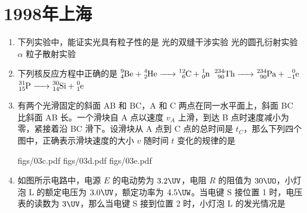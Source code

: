 \documentclass[\gkver]{gaokaozhenti}
\begin{document}
\chapter{1998年上海}

\begin{enumerate}
\item
下列实验中，能证实光具有粒子性的是
{光的双缝干涉实验}
{光的圆孔衍射实验}
{$\alpha$ 粒子散射实验}


\item
下列核反应方程中正确的是
{$\ce{^{9}_{4}Be + ^{4}_{2}He -> ^{12}_{6}C + ^{1}_{0}n}$}
{$\ce{^{234}_{90}Th -> ^{234}_{90}Pa + ^{0}_{-1}e}$}
{$\ce{^{31}_{15}P -> ^{30}_{14}Si + ^{0}_{1}e}$}


\item
有两个光滑固定的斜面 AB 和 BC，A 和 C 两点在同一水平面上，斜面 BC 比斜面 AB 长。一个滑块自 A 点以速度 $v_{A}$ 上滑，到达 B 点时速度减小为零，紧接着沿 BC 滑下。设滑块从 A 点到 C 点的总时间是 $t_{C}$，那么下列四个图中，正确表示滑块速度的大小 $v$ 随时间 $t$ 变化的规律的是

\onepicture[w=4.66cm]{}

{figs/03c.pdf}
{figs/03d.pdf}
{figs/03e.pdf}


\item
如图所示电路中，电源 $E$ 的电动势为 $3.2\UV$，电阻 $R$ 的阻值为 $30\UO$，小灯泡 L 的额定电压为 $3.0\UV$，额定功率为 $4.5\UW$。当电键 S 接位置 1 时，电压表的读数为 $3\UV$，那么当电键 S 接到位置 2 时，小灯泡 L 的发光情况是


\end{enumerate}
\end{document}
